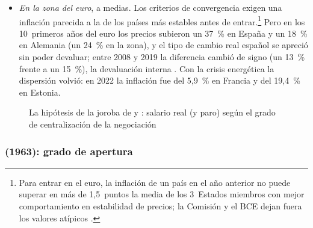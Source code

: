 \documentclass[11pt]{article}
\begin{document}
\begin{itemize}
\begin{itemize}
  \item Con datos recientes, lo que cuenta es la \emph{coordinación} entre niveles más que la centralización\nocite{OCDE2019Negotiating} .
  \item En una unión monetaria, donde el tipo de cambio ya no ajusta, esa diferencia es una perturbación asimétrica de costes, con los problemas de ajuste de .
  \end{itemize}
\item \emph{En la zona del euro}, a medias. Los criterios de convergencia exigen una inflación parecida a la de los países más estables antes de entrar.\footnote{Para entrar en el euro, la inflación de un país en el año anterior no puede superar en más de 1,5~puntos la media de los 3~Estados miembros con mejor comportamiento en estabilidad de precios; la Comisión y el BCE dejan fuera los valores atípicos\nocite{UE2016Protocolo13} .} Pero en los 10~primeros años del euro los precios subieron un 37~\% en España y un 18~\% en Alemania (un 24~\% en la zona), y el tipo de cambio real español se apreció sin poder devaluar; entre 2008 y 2019 la diferencia cambió de signo (un 13~\% frente a un 15~\%), la devaluación interna\nocite{Eurostat2026HICPaind} . Con la crisis energética la dispersión volvió: en 2022 la inflación fue del 5,9~\% en Francia y del 19,4~\% en Estonia.
\end{itemize}

\begin{figure}[H]
\centering
\caption{La hipótesis de la joroba de  y : salario real (y paro) según el grado de centralización de la negociación}\label{fig:joroba}
\end{figure}

\subsubsection{ (1963): grado de apertura}\label{sec:mckinnon}
\end{document}

